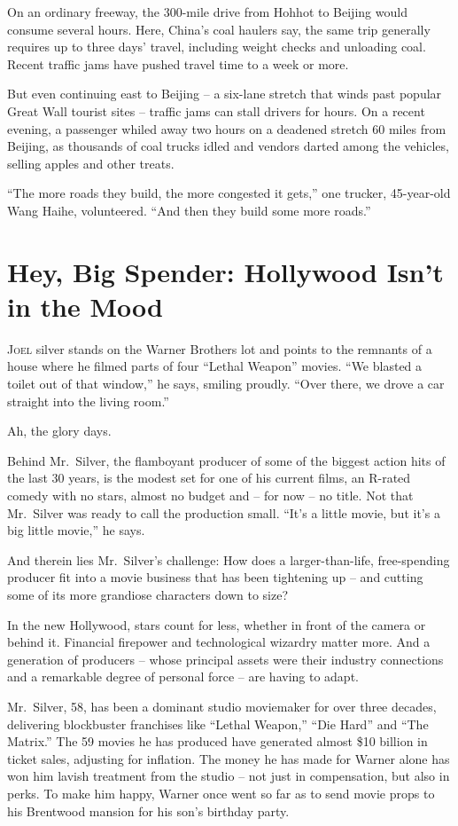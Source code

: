 ﻿\documentclass[12pt]{article}
\begin{document}
On an ordinary freeway, the 300-mile drive from Hohhot to Beijing would consume several hours. Here,
China's coal haulers say, the same trip generally requires up to three days' travel, including
weight checks and unloading coal. Recent traffic jams have pushed travel time to a week or more.

But even continuing east to Beijing -- a six-lane stretch that winds past popular Great Wall tourist
sites -- traffic jams can stall drivers for hours. On a recent evening, a passenger whiled away two
hours on a deadened stretch 60 miles from Beijing, as thousands of coal trucks idled and vendors
darted among the vehicles, selling apples and other treats.

``The more roads they build, the more congested it gets,'' one trucker, 45-year-old Wang Haihe,
volunteered. ``And then they build some more roads.''

\pagebreak
\section{Hey, Big Spender: Hollywood Isn't in the Mood}

\lettrine{J}{oel} silver stands on the Warner Brothers lot and points to the
remnants of a house where he filmed parts of four ``Lethal Weapon'' movies. ``We blasted a toilet
out of that window,'' he says, smiling proudly. ``Over there, we drove a car straight into the
living room.''

Ah, the glory days.

Behind Mr.~Silver, the flamboyant producer of some of the biggest action hits of the last 30 years,
is the modest set for one of his current films, an R-rated comedy with no stars, almost no budget
and -- for now -- no title. Not that Mr.~Silver was ready to call the production small. ``It's a
little movie, but it's a big little movie,'' he says.

And therein lies Mr.~Silver's challenge: How does a larger-than-life, free-spending producer fit
into a movie business that has been tightening up -- and cutting some of its more grandiose
characters down to size?

In the new Hollywood, stars count for less, whether in front of the camera or behind it. Financial
firepower and technological wizardry matter more. And a generation of producers -- whose principal
assets were their industry connections and a remarkable degree of personal force -- are having to
adapt.

Mr.~Silver, 58, has been a dominant studio moviemaker for over three decades, delivering blockbuster
franchises like ``Lethal Weapon,'' ``Die Hard'' and ``The Matrix.'' The 59 movies he has produced
have generated almost \$10 billion in ticket sales, adjusting for inflation. The money he has made
for Warner alone has won him lavish treatment from the studio -- not just in compensation, but also
in perks. To make him happy, Warner once went so far as to send movie props to his Brentwood mansion
for his son's birthday party.
\end{document}
